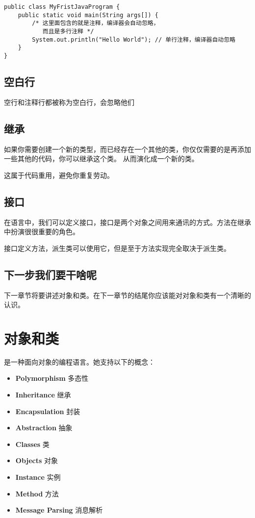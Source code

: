 \documentclass{article}
\begin{document}
\begin{verbatim}
public class MyFristJavaProgram {
	public static void main(String args[]) {
		/* 这里面包含的就是注释，编译器会自动忽略，
		   而且是多行注释 */
		System.out.println("Hello World"); // 单行注释，编译器自动忽略
	}
}
\end{verbatim}

\subsection{空白行}
空行和注释行都被称为空白行，会忽略他们

\subsection{继承}
如果你需要创建一个新的类型，而已经存在一个其他的类，你仅仅需要的是再添加一些其他的代码，你可以继承这个类。
从而演化成一个新的类。

这属于代码重用，避免你重复劳动。

\subsection{接口}
在语言中，我们可以定义接口，接口是两个对象之间用来通讯的方式。方法在继承中扮演很很重要的角色。

接口定义方法，派生类可以使用它，但是至于方法实现完全取决于派生类。

\subsection{下一步我们要干啥呢}
下一章节将要讲述对象和类。在下一章节的结尾你应该能对对象和类有一个清晰的认识。

\section{ 对象和类}
是一种面向对象的编程语言。她支持以下的概念：
\begin{itemize}
\item {\bf Polymorphism} 多态性
\item {\bf Inheritance} 继承
\item {\bf Encapsulation} 封装
\item {\bf Abstraction} 抽象
\item {\bf Classes} 类
\item {\bf Objects} 对象
\item {\bf Instance} 实例
\item {\bf Method} 方法
\item {\bf Message Parsing} 消息解析
\end{itemize}
\end{document}
